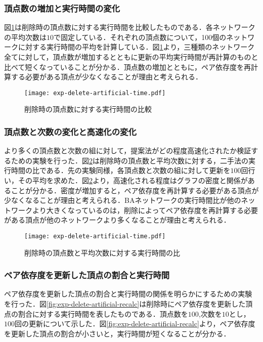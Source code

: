 \subsubsection{頂点数の増加と実行時間の変化}
図\ref{fig:exp-delete-artificial-time}は削除時の頂点数に対する実行時間を比較したものである．各ネットワークの平均次数は$10$で固定している．それぞれの頂点数について，100個のネットワークに対する実行時間の平均を計算している．図\ref{fig:exp-delete-artificial-time}より，三種類のネットワーク全てに対して，頂点数が増加するとともに更新の平均実行時間が再計算のものと比べて短くなっていることが分かる．頂点数の増加とともに，ペア依存度を再計算する必要がある頂点が少なくなることが理由と考えられる．

\begin{figure}[tb]
  \centering
  \texttt{[image: exp-delete-artificial-time.pdf]}
  \caption{削除時の頂点数に対する実行時間の比較}
  \label{fig:exp-delete-artificial-time}
\end{figure}

\subsubsection{頂点数と次数の変化と高速化の変化}
より多くの頂点数と次数の組に対して，提案法がどの程度高速化されたか検証するための実験を行った．図\ref{fig:exp-delete-artificial-ratio}は削除時の頂点数と平均次数に対する，二手法の実行時間の比である．先の実験同様，各頂点数と次数の組に対して更新を$100$回行い，その平均を求めた．図\ref{fig:exp-delete-artificial-ratio}より，高速化される程度はグラフの密度と関係があることが分かる．密度が増加すると，ペア依存度を再計算する必要がある頂点が少なくなることが理由と考えられる．BAネットワークの実行時間比が他のネットワークより大きくなっているのは，削除によってペア依存度を再計算する必要がある頂点が他のネットワークより多くなることが理由と考えられる．

\begin{figure}[tb]
  \centering
  \texttt{[image: exp-delete-artificial-time.pdf]}
  \caption{削除時の頂点数と平均次数に対する実行時間の比}
  \label{fig:exp-delete-artificial-ratio}
\end{figure}

\subsubsection{ペア依存度を更新した頂点の割合と実行時間}
ペア依存度を更新した頂点の割合と実行時間の関係を明らかにするための実験を行った．図\ref{fig:exp-delete-artificial-recalc}は削除時にペア依存度を更新した頂点の割合に対する実行時間を表したものである．頂点数を$100$,次数を$10$とし，$100$回の更新について示した．図\ref{fig:exp-delete-artificial-recalc}より，ペア依存度を更新した頂点の割合が小さいと，実行時間が短くなることが分かる．

